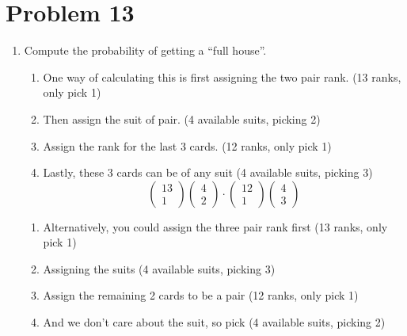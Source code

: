 \documentclass{article}
\begin{document}
\section*{Problem 13}
\begin{enumerate}[label=\alph*)]
    \item Compute the probability of getting a “full house”.
    \begin{enumerate}[label=\arabic*.]
        \item One way of calculating this is first assigning the two pair rank. (13 ranks, only pick 1)
        \item Then assign the suit of pair. (4 available suits, picking 2)
        \item Assign the rank for the last 3 cards. (12 ranks, only pick 1)
        \item Lastly, these 3 cards can be of any suit (4 available suits, picking 3)
        \begin{equation*}
            \begin{pmatrix}
                13 \\
                1
            \end{pmatrix}
            \begin{pmatrix}
                4 \\
                2
            \end{pmatrix}
            \cdot
            \begin{pmatrix}
                12 \\
                1
            \end{pmatrix}
            \begin{pmatrix}
                4 \\
                3
            \end{pmatrix}
        \end{equation*}
    \end{enumerate}
    \begin{enumerate}[label=\arabic*.]
        \item Alternatively, you could assign the three pair rank first (13 ranks, only pick 1)
        \item Assigning the suits (4 available suits, picking 3)
        \item Assign the remaining 2 cards to be a pair (12 ranks, only pick 1)
        \item And we don't care about the suit, so pick (4 available suits, picking 2)
        \begin{equation*}

\end{equation*}
\end{enumerate}
\end{enumerate}
\end{document}
